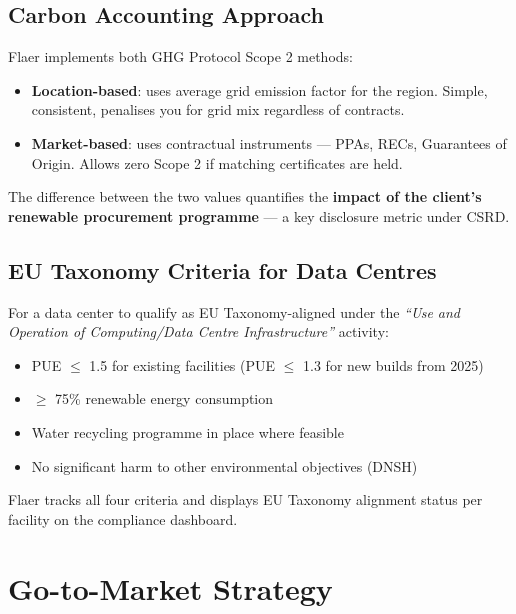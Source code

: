 \documentclass[11pt, a4paper]{article}
\begin{document}
\subsection{Carbon Accounting Approach}

Flaer implements both GHG Protocol Scope 2 methods:

\begin{itemize}[leftmargin=1.4em]
  \item \textbf{Location-based}: uses average grid emission factor for the region. Simple, consistent, penalises you for grid mix regardless of contracts.
  \item \textbf{Market-based}: uses contractual instruments — PPAs, RECs, Guarantees of Origin. Allows zero Scope 2 if matching certificates are held.
\end{itemize}

The difference between the two values quantifies the \textbf{impact of the client's renewable procurement programme} — a key disclosure metric under CSRD.

\subsection{EU Taxonomy Criteria for Data Centres}

For a data center to qualify as EU Taxonomy-aligned under the \textit{``Use and Operation of Computing/Data Centre Infrastructure''} activity:

\begin{itemize}[leftmargin=1.4em]
  \item PUE $\leq$ 1.5 for existing facilities (PUE $\leq$ 1.3 for new builds from 2025)
  \item $\geq$ 75\% renewable energy consumption
  \item Water recycling programme in place where feasible
  \item No significant harm to other environmental objectives (DNSH)
\end{itemize}

Flaer tracks all four criteria and displays EU Taxonomy alignment status per facility on the compliance dashboard.

\section{Go-to-Market Strategy}
\end{document}
